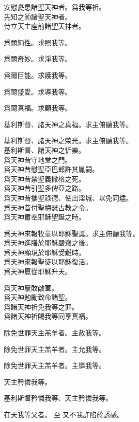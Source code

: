 \versicle 安慰憂患諸聖天神者。\hfill \response 爲我等祈。\\
先知之師諸聖天神者。\\
侍立天主座前諸聖天神者。

\versicle 爲爾純性。\hfill \response 求照我等。

\versicle 爲爾奇妙。\hfill \response 求淨我等。

\versicle 爲爾巨能。\hfill \response 求護我等。

\versicle 爲爾盛愛。\hfill \response 求導我等。

\versicle 爲爾真福。\hfill \response 求顧我等。

\versicle 基利斯督、諸天神之真福。\hfill \response 求主俯聽我等。

\versicle 基利斯督、諸天神之榮光。\hfill \response 求主俯聽我等。\\
基利斯督、諸天神之忻樂。\\
爲天神昔守地堂之門。\\
爲天神昔慰聖亞巴郎許其胤嗣。\\
爲天神昔禁聖義撒格之死。\\
爲天神昔引聖多俾亞之路。\\
爲天神昔攜聖祿德、使出淫城、以免同燼。\\
爲天神昔付聖梅瑟古教之令。\\
爲天神肅奉耶穌聖誕之時。

\versicle 爲天神來報牧童以耶穌聖誕。\hfill \response 求主俯聽我等。\\
爲天神進膳於耶穌嚴齋之後。\\
爲天神顯現於耶穌受難時。\\
爲天神來報聖徒以耶穌復活。\\
爲天神扈從耶穌升天。

爲天神屢敗敵軍。\\
爲天神勉勵致命諸聖。\\
爲諸天神祈免我等之罪。\\
爲諸天神祈賜我等同享真福。

\versicle 除免世罪天主羔羊者。\hfill \response 主赦我等。

\versicle 除免世罪天主羔羊者。\hfill \response 主允我等。

\versicle 除免世罪天主羔羊者。\hfill \response 主憐我等。

\versicle 天主矜憐我等。

\Response 基利斯督矜憐我等、天主矜憐我等。

\versicle 在天我等父者。 至 又不我許陷於誘感。

